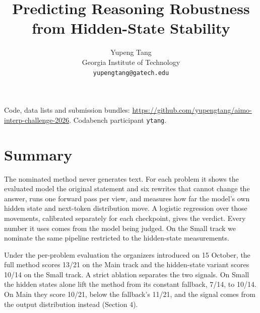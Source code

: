 \documentclass{article}
\title{Predicting Reasoning Robustness from Hidden-State Stability}
\author{Yupeng Tang\\Georgia Institute of Technology\\\texttt{yupengtang@gatech.edu}}
\begin{document}
\maketitle
\noindent Code, data lists and submission bundles: \url{https://github.com/yupengtang/aimo-interp-challenge-2026}. Codabench participant \texttt{ytang}.\par\medskip
\section{Summary}\label{summary}

The nominated method never generates text. For each problem it shows the evaluated model the original statement and six rewrites that cannot change the answer, runs one forward pass per view, and measures how far the model's own hidden state and next-token distribution move. A logistic regression over those movements, calibrated separately for each checkpoint, gives the verdict. Every number it uses comes from the model being judged. On the Small track we nominate the same pipeline restricted to the hidden-state measurements.

Under the per-problem evaluation the organizers introduced on 15 October, the full method scores 13/21 on the Main track and the hidden-state variant scores 10/14 on the Small track. A strict ablation separates the two signals. On Small the hidden states alone lift the method from its constant fallback, 7/14, to 10/14. On Main they score 10/21, below the fallback's 11/21, and the signal comes from the output distribution instead (Section 4).
\end{document}
